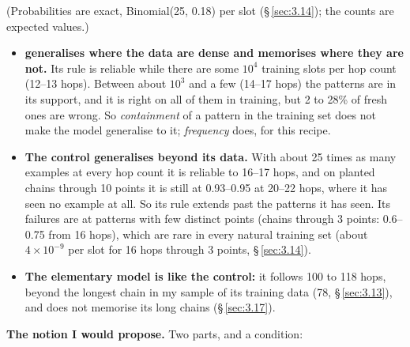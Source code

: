 \documentclass[paper=a4,fontsize=11pt,DIV=11,parskip=half,headings=small,numbers=noendperiod]{scrartcl}
\DeclareRobustCommand{\lead}[1]{\textsf{\bfseries\color{accent}#1}}
\DeclareRobustCommand{\code}[1]{{\fontseries{m}\ttfamily #1}}
\begin{document}
(Probabilities are exact, Binomial(25, 0.18) per slot (\S\,\ref{sec:3.14}); the counts are expected values.)

\begin{itemize}
\item \lead{\code{torn-\allowbreak{}bigger-\allowbreak{}13} generalises where the data are dense and memorises
  where they are not.} Its rule is reliable while there are some $10^4$ training slots per hop count (12–13
  hops). Between about $10^3$ and a few (14–17 hops) the patterns are in its support, and it is right on all of
  them in training, but 2 to 28\% of fresh ones are wrong. So \emph{containment} of a pattern in the training
  set does not make the model generalise to it; \emph{frequency} does, for this recipe.
\item \lead{The control generalises beyond its data.} With about 25 times as many examples at every hop count it
  is reliable to 16–17 hops, and on planted chains through 10 points it is still at 0.93–0.95 at 20–22 hops,
  where it has seen no example at all. So its rule extends past the patterns it has seen. Its failures are at
  patterns with few distinct points (chains through 3 points: 0.6–0.75 from 16 hops), which are rare in every
  natural training set (about $4\times10^{-9}$ per slot for 16 hops through 3 points, \S\,\ref{sec:3.14}).
\item \lead{The elementary model is like the control:} it follows 100 to 118 hops, beyond the longest chain in
  my sample of its training data (78, \S\,\ref{sec:3.13}), and does not memorise its long chains
  (\S\,\ref{sec:3.17}).
\end{itemize}

\lead{The notion I would propose.} Two parts, and a condition:
\end{document}
